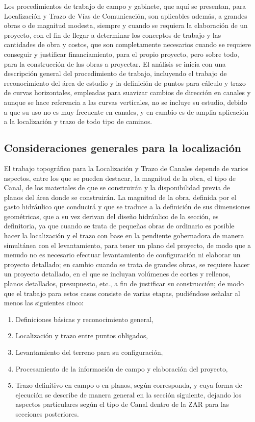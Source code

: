 Los procedimientos de trabajo de campo y gabinete, que aquí se presentan, para Localización y Trazo de Vías de Comunicación, son aplicables además, a grandes obras o de magnitud modesta, siempre y cuando se requiera la elaboración de un proyecto, con el fin de llegar a determinar los conceptos de trabajo y las cantidades de obra y costos, que son completamente necesarios cuando se requiere conseguir y justificar financiamiento, para el propio proyecto, pero sobre todo, para la construcción de las obras a proyectar. El análisis se inicia con una descripción general del procedimiento de trabajo, incluyendo el trabajo de reconocimiento del área de estudio y la definición de puntos
para cálculo y trazo de curvas horizontales, empleadas para suavizar cambios de dirección en canales y aunque se hace referencia a las curvas verticales, no se incluye su estudio, debido a que su uso no es muy frecuente en canales, y en cambio es de amplia aplicación a la localización y trazo de todo tipo de caminos.

\subsection{Consideraciones generales para la localización}

El trabajo topográfico para la Localización y Trazo de Canales depende de varios aspectos, entre los que se pueden destacar, la magnitud de la obra, el tipo de Canal, de los materiales de que se construirán y la disponibilidad previa de planos del área donde se construirán. La magnitud de la obra, definida por el gasto hidráulico que conducirá y que se traduce a la definición de sus dimensiones geométricas, que a su vez derivan del diseño hidráulico de la sección, es definitoria, ya que cuando se trata de pequeñas obras de ordinario es posible hacer la localización y el trazo con base en la pendiente gobernadora de manera simultánea con el levantamiento, para tener un plano del proyecto, de modo que a menudo no es necesario efectuar levantamiento de configuración ni elaborar un proyecto detallado; en cambio cuando se trata de grandes obras, se requiere hacer un proyecto detallado, en el que se incluyan volúmenes de cortes y rellenos, planos detallados, presupuesto, etc., a fin de justificar su construcción; de modo que el trabajo para estos casos consiste de varias etapas, pudiéndose señalar al menos las siguientes cinco: 
\begin{enumerate}
    \item Definiciones básicas y reconocimiento general,
    \item Localización y trazo entre puntos obligados,
    \item Levantamiento del terreno para su configuración,
    \item Procesamiento de la información de campo y elaboración del proyecto,
    \item Trazo definitivo en campo o en planos, según corresponda, y cuya forma de ejecución se describe de manera general en la sección siguiente, dejando los aspectos particulares según el tipo de Canal dentro de la ZAR para las secciones posteriores.
\end{enumerate}


